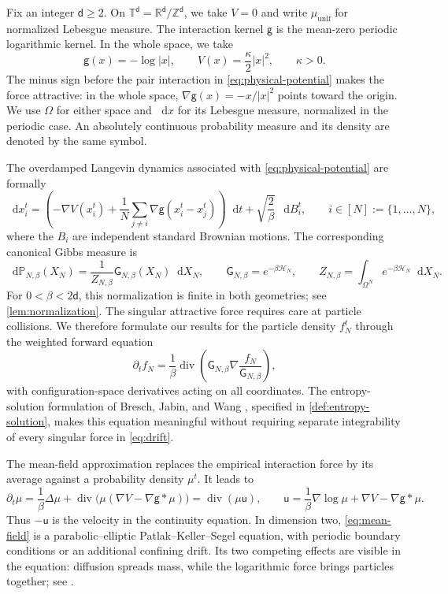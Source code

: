 \documentclass[11pt,reqno]{amsart}
\numberwithin{equation}{section}
\theoremstyle{definition}
\theoremstyle{remark}
\newcommand{\R}{\mathbb R}
\newcommand{\T}{\mathbb T}
\newcommand{\Z}{\mathbb Z}
\newcommand{\g}{\mathsf g}
\renewcommand{\d}{\mathsf d}
\newcommand{\HN}{\mathcal H_N}
\newcommand{\Pb}{\mathbb P}
\newcommand{\G}{\mathsf G}
\renewcommand{\u}{\mathsf u}
\newcommand{\muunif}{\mu_{\mathrm{unif}}}
\newcommand{\diver}{\operatorname{div}}
\newcommand{\dd}{\mathop{}\!\mathrm d}
\begin{document}
Fix an integer $\d\geq2$. On $\T^\d=\R^\d/\Z^\d$, we take $V=0$ and write $\muunif$ for normalized Lebesgue measure. The interaction kernel $\g$ is the mean-zero periodic logarithmic kernel. In the whole space, we take
\begin{equation}\label{eq:whole-kernel}
 \g(x)=-\log|x|,\qquad
 V(x)=\frac\kappa2|x|^2,\qquad \kappa>0.
\end{equation}
The minus sign before the pair interaction in \eqref{eq:physical-potential} makes the force attractive: in the whole space, $\nabla\g(x)=-x/|x|^2$ points toward the origin. We use $\Omega$ for either space and $\dd x$ for its Lebesgue measure, normalized in the periodic case. An absolutely continuous probability measure and its density are denoted by the same symbol.

The overdamped Langevin dynamics associated with \eqref{eq:physical-potential} are formally
\begin{equation}\label{eq:drift}
 \dd x_i^t
 =\left(-\nabla V(x_i^t)
       +\frac1N\sum_{j\ne i}\nabla\g(x_i^t-x_j^t)\right)\dd t
       +\sqrt{\frac2\beta}\,\dd B_i^t,
 \qquad i\in[N]:=\{1,\ldots,N\},
\end{equation}
where the $B_i$ are independent standard Brownian motions. The corresponding canonical Gibbs measure is
\begin{equation}\label{eq:physical-gibbs}
 \dd\Pb_{N,\beta}(X_N)
 =\frac{1}{Z_{N,\beta}}\G_{N,\beta}(X_N)\dd X_N,
 \qquad
 \G_{N,\beta}=e^{-\beta\HN},\qquad
 Z_{N,\beta}=\int_{\Omega^N}e^{-\beta\HN}\dd X_N.
\end{equation}
For $0<\beta<2\d$, this normalization is finite in both geometries; see \cref{lem:normalization}. The singular attractive force requires care at particle collisions. We therefore formulate our results for the particle density $f_N^t$ through the weighted forward equation
\begin{equation}\label{eq:particle}
 \partial_t f_N
 =\frac1\beta\diver\!\left(\G_{N,\beta}\nabla\frac{f_N}{\G_{N,\beta}}\right),
\end{equation}
with configuration-space derivatives acting on all coordinates. The entropy-solution formulation of Bresch, Jabin, and Wang \cite{BJW}, specified in \cref{def:entropy-solution}, makes this equation meaningful without requiring separate integrability of every singular force in \eqref{eq:drift}.

The mean-field approximation replaces the empirical interaction force by its average against a probability density $\mu^t$. It leads to
\begin{equation}\label{eq:mean-field}
 \partial_t\mu
 =\frac1\beta\Delta\mu
  +\diver\bigl(\mu(\nabla V-\nabla\g*\mu)\bigr)
 =\diver(\mu\u),
 \qquad
 \u=\frac1\beta\nabla\log\mu+\nabla V-\nabla\g*\mu.
\end{equation}
Thus $-\u$ is the velocity in the continuity equation. In dimension two, \eqref{eq:mean-field} is a parabolic--elliptic Patlak--Keller--Segel equation, with periodic boundary conditions or an additional confining drift. Its two competing effects are visible in the equation: diffusion spreads mass, while the logarithmic force brings particles together; see \cite{BJW,CdCRS}.
\end{document}
